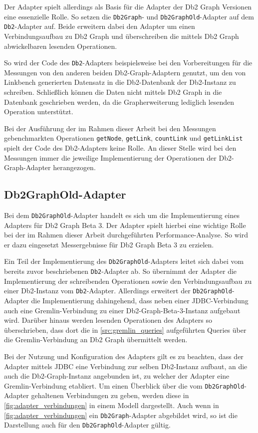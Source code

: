 Der Adapter spielt allerdings als Basis für die Adapter der Db2 Graph Versionen eine essenzielle Rolle. So setzen die \texttt{Db2Graph}- und \texttt{Db2GraphOld}-Adapter auf dem \texttt{Db2}-Adapter auf. Beide erweitern dabei den Adapter um einen Verbindungsaufbau zu Db2 Graph und überschreiben die mittels Db2 Graph abwickelbaren lesenden Operationen.

So wird der Code des \texttt{Db2}-Adapters beispielsweise bei den Vorbereitungen für die Messungen von den anderen beiden Db2-Graph-Adaptern genutzt, um den von Linkbench generierten Datensatz in die Db2-Datenbank der Db2-Instanz zu schreiben. Schließlich können die Daten nicht mittels Db2 Graph in die Datenbank geschrieben werden, da die Grapherweiterung lediglich lesenden Operation unterstützt.

Bei der Ausführung der im Rahmen dieser Arbeit bei den Messungen gebenchmarkten Operationen \texttt{getNode}, \texttt{getLink}, \texttt{countLink} und \texttt{getLinkList} spielt der Code des Db2-Adapters keine Rolle. An dieser Stelle wird bei den Messungen immer die jeweilige Implementierung der Operationen der Db2-Graph-Adapter herangezogen.

\subsection{Db2GraphOld-Adapter}
\label{implementierung:adapter:db2graph:old}
Bei dem \texttt{Db2GraphOld}-Adapter handelt es sich um die Implementierung eines Adapters für Db2 Graph Beta 3. Der Adapter spielt hierbei eine wichtige Rolle bei der im Rahmen dieser Arbeit durchgeführten Performance-Analyse. So wird er dazu eingesetzt Messergebnisse für Db2 Graph Beta 3 zu erzielen. 

Ein Teil der Implementierung des \texttt{Db2GraphOld}-Adapters leitet sich dabei vom bereits zuvor beschriebenen \texttt{Db2}-Adapter ab. So übernimmt der Adapter die Implementierung der schreibenden Operationen sowie den Verbindungsaufbau zu einer Db2-Instanz vom \texttt{Db2}-Adapter. Allerdings erweitert der \texttt{Db2GraphOld}-Adapter die Implementierung dahingehend, dass neben einer JDBC-Verbindung auch eine Gremlin-Verbindung zu einer Db2-Graph-Beta-3-Instanz aufgebaut wird. Darüber hinaus werden lesenden Operationen des Adapters so überschrieben, dass dort die in \autoref{src:gremlin_queries} aufgeführten Queries über die Gremlin-Verbindung an Db2 Graph übermittelt werden. 

Bei der Nutzung und Konfiguration des Adapters gilt es zu beachten, dass der Adapter mittels JDBC eine Verbindung zur selben Db2-Instanz aufbaut, an die auch die Db2-Graph-Instanz angebunden ist, zu welcher der Adapter eine Gremlin-Verbindung etabliert. Um einen Überblick über die vom \texttt{Db2GraphOld}-Adapter gehaltenen Verbindungen zu geben, werden diese in \autoref{fig:adapter_verbindungen} in einem Modell dargestellt. Auch wenn in \autoref{fig:adapter_verbindungen} ein \texttt{Db2Graph}-Adapter abgebildet wird, so ist die Darstellung auch für den \texttt{Db2GraphOld}-Adapter gültig.

